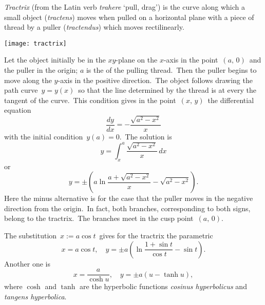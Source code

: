 \documentclass[12pt]{article}
\theoremstyle{definition}
\begin{document}
{\em Tractrix} (from the Latin verb {\em trahere} `pull, drag') is the curve along which a small object ({\em tractens}) moves when pulled on a horizontal plane with  a piece of thread by a puller ({\em tractendus}) which moves rectilinearly.
\begin{center}
\texttt{[image: tractrix]}
\end{center}

Let the object initially be in the $xy$-plane on the $x$-axis in the point \,$(a,\,0)$\, and the puller in the origin; $a$ is the  of the pulling thread. \,Then the puller begins to move along the $y$-axis in the positive direction. \,The object follows drawing the path curve \,$y = y(x)$\, so that the line determined by the thread is at every  the tangent of the curve. \,This condition gives in the point \,$(x,\,y)$\, the  differential equation
   $$\frac{dy}{dx} = -\frac{\sqrt{a^2-x^2}}{x}$$
with the initial condition \,$y(a) = 0$. \,The solution is
   $$y = \int_x^a\frac{\sqrt{a^2-x^2}}{x}\,dx$$
or
  $$y = \pm(a\ln{\frac{a+\sqrt{a^2-x^2}}{x}}-\sqrt{a^2-x^2}).$$
Here the minus alternative is for the case that the puller moves in the negative direction from the origin. \,In fact, both branches, corresponding to both signs, belong to the tractrix. \,The branches meet in the cusp point\, $(a,\,0)$.

The substitution \,$x := a\cos{t}$\, gives for the tractrix the parametric 
  $$x = a\cos{t}, \quad y = \pm a(\ln\frac{1+\sin{t}}{\cos{t}}-\sin{t}).$$
Another one is 
  $$x = \frac{a}{\cosh{u}}, \quad y = \pm a(u-\tanh{u}),$$
where $\cosh$ and $\tanh$ are the hyperbolic functions {\em cosinus hyperbolicus} and {\em tangens hyperbolica}.
\end{document}
